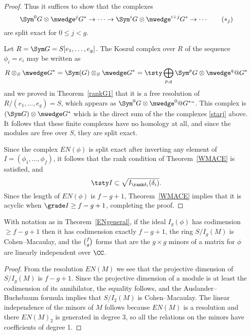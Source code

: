 \begin{proof}
Thus it suffices to show that the complexes
\begin{equation}
\Sym^{0}G\otimes\mwedge^{j}G^{*}\to\cdots \to \Sym^{i}G
\otimes  \mwedge^{i+j}G^{*}  \to \cdots
\tag{$*_j$}
\label{starj}
\end{equation}
are split exact for $0\leq j<g$.

Let $R = \Sym G = S[e_{1}, \dots, e_{g}]$. The Koszul complex over $R$
%
of the sequence $\phi_{i} = e_{i}$
may be written as
$$
R\otimes_{S}\mwedge G^* =   \Sym(G)\otimes_{S} \mwedge G^* = 
\tsty\bigoplus\limits_{p,q}\Sym^{p}G\otimes\mwedge^{q}@G^*
$$
and we 
proved
in Theorem~\ref{rankG1} that it is a free resolution
of $R/(e_1, \dots, e_g)=S$, which appears
as $\Sym^{0}G\otimes \mwedge^{0}@G^*` `$. This complex
is
$(\Sym G)\otimes\mwedge G^{*}$
which is the direct sum of the the complexes 
\eqref{starj} above. It follows
that these finite
complexes have no homology at all, and since the modules are free over
$S$, they are split exact.

Since the
complex $EN(\phi)$ is split exact after inverting any element of $I =
(\phi_{1}, \dots, \phi_{f})$, it follows that
the rank condition of Theorem~\ref{WMACE} is satisfied, and
$$
\tsty %
I \subset \sqrt{I_{\rank\smash{\delta_i}}(\delta_i)}.
$$
Since the length of $EN(\phi)$  is $f-g+1$, Theorem~\ref{WMACE}
implies that
it is acyclic when $\grade I\geq f-g+1$, completing the proof.
\end{proof}

\begin{corollary}\label{E-N cor}
With notation as in Theorem~\ref{ENgeneral}, if the ideal $I_g(\phi)$
has codimension $\geq f-g+1$ then it has
codimension exactly $f-g+1$, the ring $S/I_g(M)$ is Cohen--Macaulay,
and the $\tbinom{f}{g}$ forms
that are the $g\times g$ minors of a matrix for $\phi$ are linearly
independent over $\CC$.
\end{corollary}

\begin{proof}
From the resolution $EN(M)$ we see that the projective dimension of
$S/I_g(M)$ is $f-g+1$. Since the projective dimension of a module
is at least the codimension of its annihilator, the equality follows,
and the Auslander--Buchsbaum formula implies that $S/I_2(M)$ is
%
%
Cohen--Macaulay. The linear independence of the minors of $M$ follows
because $EN(M)$ is a resolution and there
$EN(M)_2$ is generated in degree 3, so all the relations on the minors
have coefficients of degree 1.
\end{proof}

